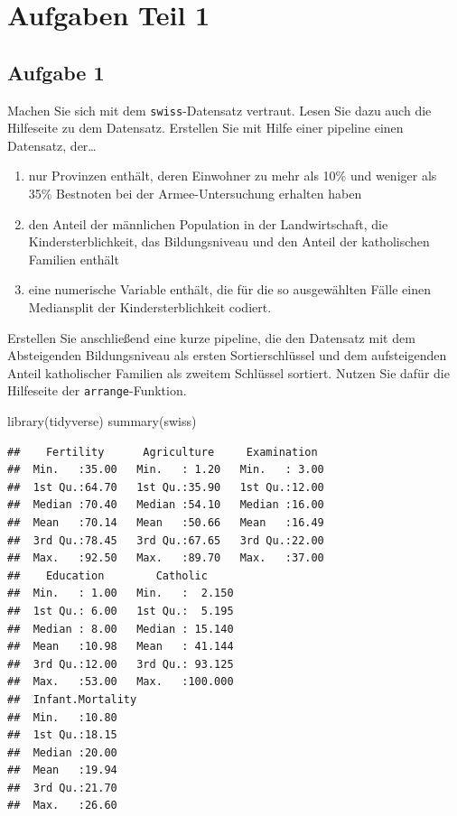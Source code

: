 \documentclass[
]{book}
\newenvironment{Shaded}{\begin{snugshade}}{\end{snugshade}}
\newcommand{\FunctionTok}[1]{\textcolor[rgb]{0.00,0.00,0.00}{#1}}
\newcommand{\NormalTok}[1]{#1}
\begin{document}
\hypertarget{aufgaben-teil-1}{%
\section{Aufgaben Teil 1}\label{aufgaben-teil-1}}

\hypertarget{aufgabe-1-1}{%
\subsection{Aufgabe 1}\label{aufgabe-1-1}}

Machen Sie sich mit dem \texttt{swiss}-Datensatz vertraut. Lesen Sie dazu auch die Hilfeseite zu dem Datensatz.
Erstellen Sie mit Hilfe einer pipeline einen Datensatz, der\ldots{}

\begin{enumerate}
\def\labelenumi{\arabic{enumi}.}
\item
  nur Provinzen enthält, deren Einwohner zu mehr als 10\% und weniger als 35\% Bestnoten bei der Armee-Untersuchung erhalten haben
\item
  den Anteil der männlichen Population in der Landwirtschaft, die Kindersterblichkeit, das Bildungsniveau und den Anteil der katholischen Familien enthält
\item
  eine numerische Variable enthält, die für die so ausgewählten Fälle einen Mediansplit der Kindersterblichkeit codiert.
\end{enumerate}

Erstellen Sie anschließend eine kurze pipeline, die den Datensatz mit dem Absteigenden Bildungsniveau als ersten Sortierschlüssel und dem aufsteigenden Anteil katholischer Familien als zweitem Schlüssel sortiert. Nutzen Sie dafür die Hilfeseite der \texttt{arrange}-Funktion.

\hypertarget{solution1}{}
\begin{Shaded}
\begin{Highlighting}[]
\FunctionTok{library}\NormalTok{(tidyverse)}
\FunctionTok{summary}\NormalTok{(swiss)}
\end{Highlighting}
\end{Shaded}

\begin{verbatim}
##    Fertility      Agriculture     Examination   
##  Min.   :35.00   Min.   : 1.20   Min.   : 3.00  
##  1st Qu.:64.70   1st Qu.:35.90   1st Qu.:12.00  
##  Median :70.40   Median :54.10   Median :16.00  
##  Mean   :70.14   Mean   :50.66   Mean   :16.49  
##  3rd Qu.:78.45   3rd Qu.:67.65   3rd Qu.:22.00  
##  Max.   :92.50   Max.   :89.70   Max.   :37.00  
##    Education        Catholic      
##  Min.   : 1.00   Min.   :  2.150  
##  1st Qu.: 6.00   1st Qu.:  5.195  
##  Median : 8.00   Median : 15.140  
##  Mean   :10.98   Mean   : 41.144  
##  3rd Qu.:12.00   3rd Qu.: 93.125  
##  Max.   :53.00   Max.   :100.000  
##  Infant.Mortality
##  Min.   :10.80   
##  1st Qu.:18.15   
##  Median :20.00   
##  Mean   :19.94   
##  3rd Qu.:21.70   
##  Max.   :26.60
\end{verbatim}
\end{document}
